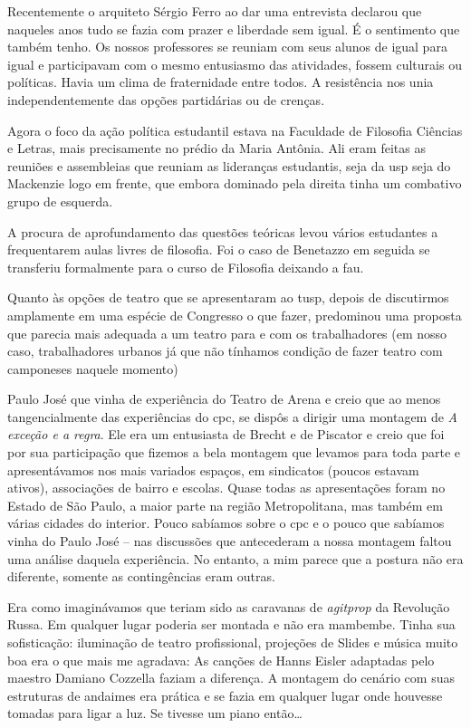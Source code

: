Recentemente o arquiteto Sérgio Ferro ao dar uma entrevista declarou que
naqueles anos tudo se fazia com prazer e liberdade sem igual. É o
sentimento que também tenho. Os nossos professores se reuniam com seus
alunos de igual para igual e participavam com o mesmo entusiasmo das
atividades, fossem culturais ou políticas. Havia um clima de
fraternidade entre todos. A resistência nos unia independentemente das
opções partidárias ou de crenças.

Agora o foco da ação política estudantil estava na Faculdade de
Filosofia Ciências e Letras, mais precisamente no prédio da Maria
Antônia. Ali eram feitas as reuniões e assembleias que reuniam as
lideranças estudantis, seja da {\sc usp} seja do Mackenzie logo em frente, que
embora dominado pela direita tinha um combativo grupo de esquerda.

A procura de aprofundamento das questões teóricas levou vários
estudantes a frequentarem aulas livres de filosofia. Foi o caso de
Benetazzo em seguida se transferiu formalmente para o curso de Filosofia
deixando a {\sc fau}.

Quanto às opções de teatro que se apresentaram ao {\sc tusp}, depois de
discutirmos amplamente em uma espécie de Congresso o que fazer,
predominou uma proposta que parecia mais adequada a um teatro para e com
os trabalhadores (em nosso caso, trabalhadores urbanos já que não
tínhamos condição de fazer teatro com camponeses naquele momento)

Paulo José que vinha de experiência do Teatro de Arena e creio que ao
menos tangencialmente das experiências do {\sc cpc}, se dispôs a dirigir uma
montagem de {\it A exceção e a regra}. Ele era um entusiasta de Brecht e
de Piscator e creio que foi por sua participação que fizemos a bela
montagem que levamos para toda parte e apresentávamos nos mais variados
espaços, em sindicatos (poucos estavam ativos), associações de bairro e
escolas. Quase todas as apresentações foram no Estado de São Paulo, a
maior parte na região Metropolitana, mas também em várias cidades do
interior. Pouco sabíamos sobre o {\sc cpc} e o pouco que sabíamos vinha do
Paulo José -- nas discussões que antecederam a nossa montagem faltou uma
análise daquela experiência. No entanto, a mim parece que a postura não
era diferente, somente as contingências eram outras.

Era como imaginávamos que teriam sido as caravanas de {\it agitprop} da
Revolução Russa. Em qualquer lugar poderia ser montada e não era
mambembe. Tinha sua sofisticação: iluminação de teatro profissional,
projeções de Slides e música muito boa era o que mais me agradava: As
canções de Hanns Eisler adaptadas pelo maestro Damiano Cozzella faziam a
diferença. A montagem do cenário com suas estruturas de andaimes era
prática e se fazia em qualquer lugar onde houvesse tomadas para ligar a
luz. Se tivesse um piano então\ldots{}

